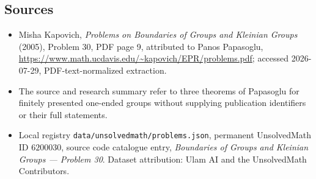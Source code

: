 \documentclass[11pt]{article}
\begin{document}
\subsection{Sources}
\begin{itemize}
\item Misha Kapovich, \emph{Problems on Boundaries of Groups and Kleinian Groups} (2005), Problem 30, PDF page 9, attributed to Panos Papasoglu, \url{https://www.math.ucdavis.edu/~kapovich/EPR/problems.pdf}; accessed 2026-07-29, PDF-text-normalized extraction.
\item The source and research summary refer to three theorems of Papasoglu for finitely presented one-ended groups without supplying publication identifiers or their full statements.
\item Local registry \texttt{data/unsolvedmath/problems.json}, permanent UnsolvedMath ID $6200030$, source code catalogue entry, \emph{Boundaries of Groups and Kleinian Groups --- Problem 30}. Dataset attribution: Ulam AI and the UnsolvedMath Contributors.
\end{itemize}
\end{document}
